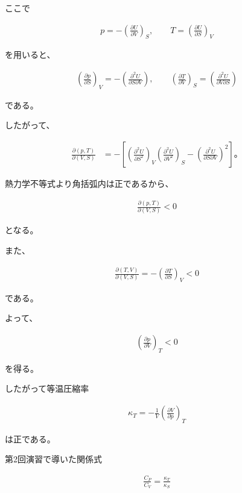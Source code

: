 \documentclass[platex,dvipdfmx,a4paper]{jsarticle}
\begin{document}
ここで

\begin{align*}
p
=
-\left(
\frac{\partial U}{\partial V}
\right)_S,
\qquad
T
=
\left(
\frac{\partial U}{\partial S}
\right)_V
\end{align*}

を用いると、

\begin{align*}
\left(
\frac{\partial p}{\partial S}
\right)_V
=
-
\left(
\frac{\partial^2U}{\partial S\partial V}
\right),
\qquad
\left(
\frac{\partial T}{\partial V}
\right)_S
=
\left(
\frac{\partial^2U}{\partial V\partial S}
\right)
\end{align*}

である。

したがって、

\begin{align*}
\frac{\partial(p,T)}{\partial(V,S)}
&=
-
\left[
\left(
\frac{\partial^2U}{\partial S^2}
\right)_V
\left(
\frac{\partial^2U}{\partial V^2}
\right)_S
-
\left(
\frac{\partial^2U}{\partial S\partial V}
\right)^2
\right]。
\end{align*}

熱力学不等式より角括弧内は正であるから、

\begin{align*}
\frac{\partial(p,T)}{\partial(V,S)}
<0
\end{align*}

となる。

また、

\begin{align*}
\frac{\partial(T,V)}{\partial(V,S)}
=
-
\left(
\frac{\partial T}{\partial S}
\right)_V
<0
\end{align*}

である。

よって、

\begin{align*}
\left(
\frac{\partial p}{\partial V}
\right)_T
<0
\end{align*}

を得る。

したがって等温圧縮率

\begin{align*}
\kappa_T
=
-\frac1V
\left(
\frac{\partial V}{\partial p}
\right)_T
\end{align*}

は正である。

第2回演習で導いた関係式

\begin{align*}
\frac{C_P}{C_V}
=
\frac{\kappa_T}{\kappa_S}
\end{align*}
\end{document}

